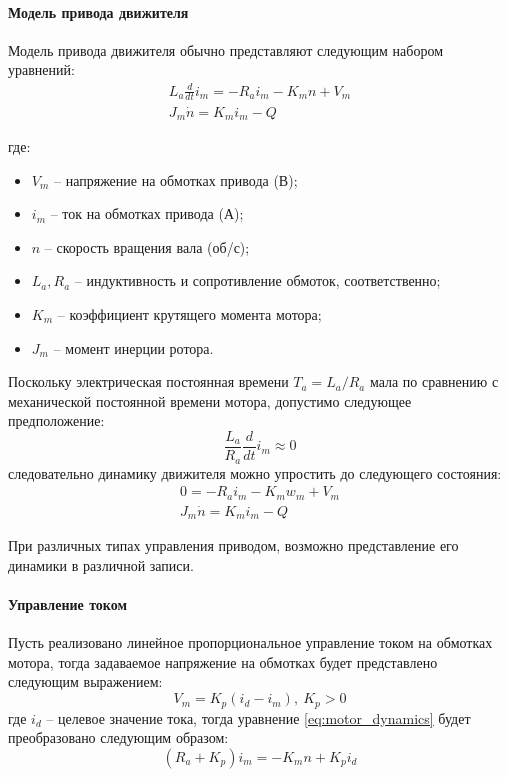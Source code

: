 \paragraph{Модель привода движителя}

Модель привода движителя обычно представляют следующим набором уравнений:
\begin{gather}
    L_a\frac{d}{dt}i_m=-R_ai_m-K_m n + V_m \\
    J_m\dot{n} = K_m i_m - Q
\end{gather}

\noindent где:
\begin{itemize}
    \item $V_m$ -- напряжение на обмотках привода (В);
    \item $i_m$ -- ток на обмотках привода (А);
    \item $n$ -- скорость вращения вала (об/с);
    \item $L_a, R_a$ -- индуктивность и сопротивление обмоток, соответственно;
    \item $K_m$ -- коэффициент крутящего момента мотора;
    \item $J_m$ -- момент инерции ротора.
\end{itemize}

Поскольку электрическая постоянная времени $T_a=L_a/R_a$ мала по сравнению с механической постоянной времени мотора, допустимо следующее предположение:
\begin{equation}
    \frac{L_a}{R_a}\frac{d}{dt}i_m \approx 0
\end{equation}
\noindent следовательно динамику движителя можно упростить до следующего состояния:
\begin{gather}
    \label{eq:motor_dynamics}
    0 = -R_a i_m-K_m w_m + V_m \\
    J_m\dot{n} = K_m i_m - Q
\end{gather}

При различных типах управления приводом, возможно представление его динамики в различной записи.

\paragraph{Управление током}
Пусть реализовано линейное пропорциональное управление током на обмотках мотора, тогда задаваемое напряжение на обмотках будет представлено следующим выражением:
\begin{equation}
    V_m = K_p(i_d - i_m),\: K_p>0
\end{equation}
\noindent где $i_d$ -- целевое значение тока, тогда уравнение \ref{eq:motor_dynamics} будет преобразовано следующим образом:
\begin{equation}
    (R_a + K_p)i_m = -K_mn + K_pi_d
\end{equation}

